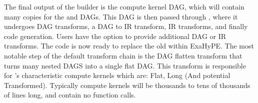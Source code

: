 The final output of the  builder is the compute kernel DAG, which will contain many copies for the  and  DAGs.
This DAG is then passed through \phlat, where it undergoes DAG transforms, a DAG to IR transform, IR transforms, and finally code generation.
Users have the option to provide additional DAG or IR transforms.
The code is now ready to replace the old  within ExaHyPE.
The most notable step of the default transform chain is the DAG flatten transform that turns many nested DAGS into a single flat DAG.
This transform is responsible for \phlat's characteristic compute kernels which are: Flat, Long (And potential Transformed).
Typically compute kernels will be thousands to tens of thousands of lines long, and contain no function calls.   